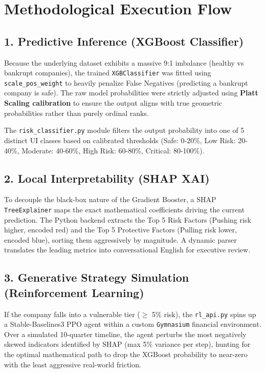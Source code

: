 \documentclass[11pt, a4paper]{article}
\begin{document}
\vspace{1em}

\section{Methodological Execution Flow}

\subsection{1. Predictive Inference (XGBoost Classifier)}
Because the underlying dataset exhibits a massive 9:1 imbalance (healthy vs bankrupt companies), the trained \texttt{XGBClassifier} was fitted using \texttt{scale\_pos\_weight} to heavily penalize False Negatives (predicting a bankrupt company is safe). The raw model probabilities were strictly adjusted using \textbf{Platt Scaling calibration} to ensure the output aligns with true geometric probabilities rather than purely ordinal ranks. 

The \texttt{risk\_classifier.py} module filters the output probability into one of 5 distinct UI classes based on calibrated thresholds (Safe: 0-20\%, Low Risk: 20-40\%, Moderate: 40-60\%, High Risk: 60-80\%, Critical: 80-100\%).

\subsection{2. Local Interpretability (SHAP XAI)}
To decouple the black-box nature of the Gradient Booster, a SHAP \texttt{TreeExplainer} maps the exact mathematical coefficients driving the current prediction. The Python backend extracts the Top 5 Risk Factors (Pushing risk higher, encoded red) and the Top 5 Protective Factors (Pulling risk lower, encoded blue), sorting them aggressively by magnitude. A dynamic parser translates the leading metrics into conversational English for executive review.

\subsection{3. Generative Strategy Simulation (Reinforcement Learning)}
If the company falls into a vulnerable tier ($\ge$ 5\% risk), the \texttt{rl\_api.py} spins up a Stable-Baselines3 PPO agent within a custom \texttt{Gymnasium} financial environment. Over a simulated 10-quarter timeline, the agent perturbs the most negatively skewed indicators identified by SHAP (max 5\% variance per step), hunting for the optimal mathematical path to drop the XGBoost probability to near-zero with the least aggressive real-world friction.
\end{document}

